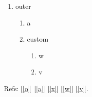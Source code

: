 \documentclass{article}
\begin{document}
\begin{enumerate}
\item outer\label{o}
  \begin{enumerate}
  \item a\label{a}
  \item[(X)] custom\label{x}
    \begin{enumerate}\item[(W)] w\label{w}\item v\label{v}\end{enumerate}
  \end{enumerate}
\end{enumerate}
Refs: [\ref{o}] [\ref{a}] [\ref{x}] [\ref{w}] [\ref{v}].
\end{document}
